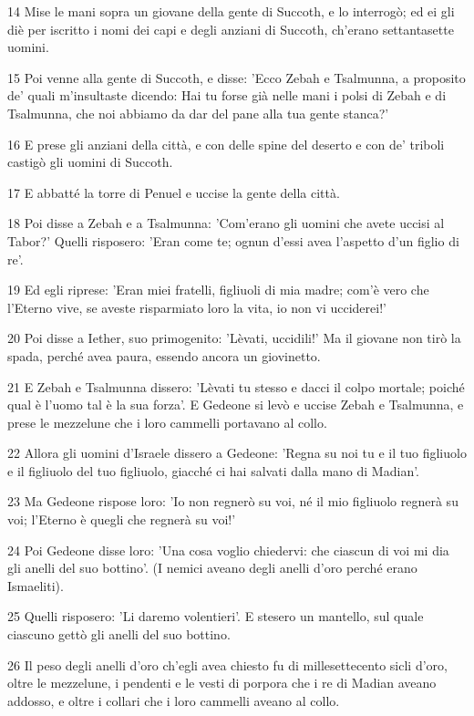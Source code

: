 \par 14 Mise le mani sopra un giovane della gente di Succoth, e lo interrogò; ed ei gli diè per iscritto i nomi dei capi e degli anziani di Succoth, ch'erano settantasette uomini.
\par 15 Poi venne alla gente di Succoth, e disse: 'Ecco Zebah e Tsalmunna, a proposito de' quali m'insultaste dicendo: Hai tu forse già nelle mani i polsi di Zebah e di Tsalmunna, che noi abbiamo da dar del pane alla tua gente stanca?'
\par 16 E prese gli anziani della città, e con delle spine del deserto e con de' triboli castigò gli uomini di Succoth.
\par 17 E abbatté la torre di Penuel e uccise la gente della città.
\par 18 Poi disse a Zebah e a Tsalmunna: 'Com'erano gli uomini che avete uccisi al Tabor?' Quelli risposero: 'Eran come te; ognun d'essi avea l'aspetto d'un figlio di re'.
\par 19 Ed egli riprese: 'Eran miei fratelli, figliuoli di mia madre; com'è vero che l'Eterno vive, se aveste risparmiato loro la vita, io non vi ucciderei!'
\par 20 Poi disse a Iether, suo primogenito: 'Lèvati, uccidili!' Ma il giovane non tirò la spada, perché avea paura, essendo ancora un giovinetto.
\par 21 E Zebah e Tsalmunna dissero: 'Lèvati tu stesso e dacci il colpo mortale; poiché qual è l'uomo tal è la sua forza'. E Gedeone si levò e uccise Zebah e Tsalmunna, e prese le mezzelune che i loro cammelli portavano al collo.
\par 22 Allora gli uomini d'Israele dissero a Gedeone: 'Regna su noi tu e il tuo figliuolo e il figliuolo del tuo figliuolo, giacché ci hai salvati dalla mano di Madian'.
\par 23 Ma Gedeone rispose loro: 'Io non regnerò su voi, né il mio figliuolo regnerà su voi; l'Eterno è quegli che regnerà su voi!'
\par 24 Poi Gedeone disse loro: 'Una cosa voglio chiedervi: che ciascun di voi mi dia gli anelli del suo bottino'. (I nemici aveano degli anelli d'oro perché erano Ismaeliti).
\par 25 Quelli risposero: 'Li daremo volentieri'. E stesero un mantello, sul quale ciascuno gettò gli anelli del suo bottino.
\par 26 Il peso degli anelli d'oro ch'egli avea chiesto fu di millesettecento sicli d'oro, oltre le mezzelune, i pendenti e le vesti di porpora che i re di Madian aveano addosso, e oltre i collari che i loro cammelli aveano al collo.
